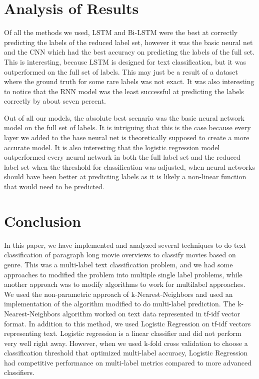 \documentclass[sigconf]{acmart}
\begin{document}
\section{Analysis of Results}
Of all the methods we used, LSTM and Bi-LSTM were the best at correctly predicting the labels of the reduced label set, however it was the basic neural net and the CNN which had the best accuracy on predicting the labels of the full set. This is interesting, because LSTM is designed for text classification, but it was outperformed on the full set of labels. This may just be a result of a dataset where the ground truth for some rare labels was not exact.  It was also interesting to notice that the RNN model was the least successful at predicting the labels correctly by about seven percent. 

Out of all our models, the absolute best scenario was the basic neural network model on the full set of labels. It is intriguing that this is the case because every layer we added to the base neural net is theoretically supposed to create a more accurate model. It is also interesting that the logistic regression model outperformed every neural network in both the full label set and the reduced label set when the threshold for classification was adjusted, when neural networks should have been better at predicting labels as it is likely a non-linear function that would need to be predicted.

\section{Conclusion}
In this paper, we have implemented and analyzed several techniques to do text classification of paragraph long movie overviews to classify movies based on genre. This was a multi-label text classification problem, and we had some approaches to modified the problem into multiple single label problems, while another approach was to modify algorithms to work for multilabel approaches. We used the non-parametric approach of k-Nearest-Neighbors and used an implementation of the algorithm modified to do multi-label prediction. The k-Nearest-Neighbors algorithm worked on text data represented in tf-idf vector format. In addition to this method, we used Logistic Regression on tf-idf vectors representing text.  Logistic regression is a linear classifier and did not perform very well right away.  However, when we used k-fold cross validation to choose a classification threshold that optimized multi-label accuracy, Logistic Regression had competitive performance on multi-label metrics compared to more advanced classifiers. 
\end{document}
